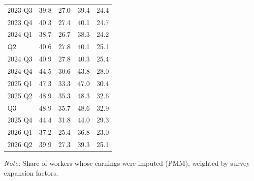 \begin{table}[H]
{\begin{threeparttable}
\begin{tabular}[t]{lcccc}
        2023 Q3               & 39.8                      & 27.0                     & 39.4    & 24.4    \\
        2023 Q4               & 40.3                      & 27.4                     & 40.1    & 24.7    \\
        2024 Q1               & 38.7                      & 26.7                     & 38.3    & 24.2    \\
        \addlinespace
        2024 Q2               & 40.6                      & 27.8                     & 40.1    & 25.1    \\
        2024 Q3               & 40.9                      & 27.8                     & 40.3    & 25.4    \\
        2024 Q4               & 44.5                      & 30.6                     & 43.8    & 28.0    \\
        2025 Q1               & 47.3                      & 33.3                     & 47.0    & 30.4    \\
        2025 Q2               & 48.9                      & 35.3                     & 48.3    & 32.6    \\
        \addlinespace
        2025 Q3               & 48.9                      & 35.7                     & 48.6    & 32.9    \\
        2025 Q4               & 44.4                      & 31.8                     & 44.0    & 29.3    \\
        2026 Q1               & 37.2                      & 25.4                     & 36.8    & 23.0    \\
        2026 Q2               & 39.9                      & 27.3                     & 39.3    & 25.1    \\
        \bottomrule
      \end{tabular}
      \begin{tablenotes}
        \item \textit{Note: }  Share of workers whose earnings were imputed (PMM), weighted by survey expansion factors.
      \end{tablenotes}
    \end{threeparttable}}
\end{table}

